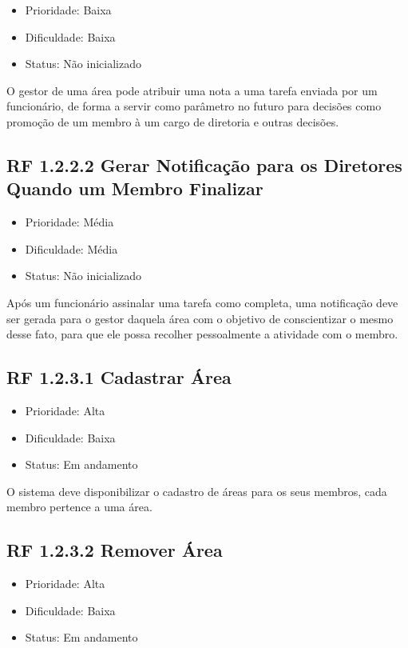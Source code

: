 \begin{apendicesenv}
\begin{itemize}
  \item{Prioridade: Baixa}
  \item{Dificuldade: Baixa}
  \item{Status: Não inicializado}
\end{itemize}

O gestor de uma área pode atribuir uma nota a uma tarefa enviada por um funcionário, de forma a servir como parâmetro no futuro para decisões como promoção de um membro à um cargo de diretoria e outras decisões.


\subsection{RF 1.2.2.2 Gerar Notificação para os Diretores Quando um Membro Finalizar}

\begin{itemize}
  \item{Prioridade: Média}
  \item{Dificuldade: Média}
  \item{Status: Não inicializado}
\end{itemize}

Após um funcionário assinalar uma tarefa como completa, uma notificação deve ser gerada para o gestor daquela área com o objetivo de conscientizar o mesmo desse fato, para que ele possa recolher pessoalmente a atividade com o membro.


\subsection{RF 1.2.3.1 Cadastrar Área}

\begin{itemize}
  \item{Prioridade: Alta}
  \item{Dificuldade: Baixa}
  \item{Status: Em andamento}
\end{itemize}

O sistema deve disponibilizar o cadastro de áreas para os seus membros, cada membro pertence a uma área.


\subsection{RF 1.2.3.2 Remover Área}

\begin{itemize}
  \item{Prioridade: Alta}
  \item{Dificuldade: Baixa}
  \item{Status: Em andamento}
\end{itemize}


\end{apendicesenv}
